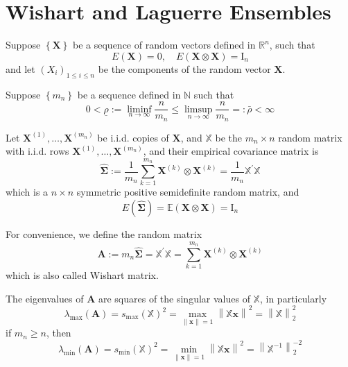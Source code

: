 \chapter{Wishart and Laguerre Ensembles}

Suppose $\left\{\mathbf{X}\right\}$ be a sequence of random vectors defined in $\mathbb{R}^{n}$, such that
\begin{equation*}
    E\left(\mathbf{X}\right)=0,\quad E\left(\mathbf{X}\otimes\mathbf{X}\right)=\mathrm{I}_{n}
\end{equation*}
and let $\left(X_{i}\right)_{1\leq i\leq n}$ be the components of the random vector $\mathbf{X}$.

Suppose $\left\{m_{n}\right\}$ be a sequence defined in $\mathbb{N}$ such that
\begin{equation*}
    0<\underline{\rho}:=\liminf_{n\rightarrow\infty}\frac{n}{m_{n}}\leq\limsup_{n\rightarrow\infty}\frac{n}{m_{n}}=:\bar{\rho}<\infty
\end{equation*}

Let $\mathbf{X}^{(1)},\ldots,\mathbf{X}^{\left(m_{n}\right)}$ be i.i.d. copies of $\mathbf{X}$, and $\mathbb{X}$ be the $m_{n}\times n$ random matrix with i.i.d. rows $\mathbf{X}^{(1)},\ldots,\mathbf{X}^{\left(m_{n}\right)}$, and their empirical covariance matrix is
\begin{equation*}
    \widehat{\boldsymbol{\Sigma}}:=\frac{1}{m_{n}}\sum_{k=1}^{m_{n}}\mathbf{X}^{(k)}\otimes \mathbf{X}^{(k)}=\frac{1}{m_{n}}\mathbb{X}^{\prime}\mathbb{X}
\end{equation*}
which is a $n\times n$ symmetric positive semidefinite random matrix, and
\begin{equation*}
    E\left(\widehat{\boldsymbol{\Sigma}}\right)=\mathbb{E}\left(\mathbf{X}\otimes\mathbf{X}\right)=\mathrm{I}_{n}
\end{equation*}

For convenience, we define the random matrix
\begin{equation*}
    \mathbf{A}:=m_{n}\widehat{\boldsymbol{\Sigma}}=\mathbb{X}^{\prime}\mathbb{X}=\sum_{k=1}^{m_{n}}\mathbf{X}^{(k)}\otimes\mathbf{X}^{(k)}
\end{equation*}
which is also called Wishart matrix.

\begin{theorem}
    The eigenvalues of $\mathbf{A}$ are squares of the singular values of $\mathbb{X}$, in particularly
    \begin{equation}
        \lambda_{\max}\left(\mathbf{A}\right)=s_{\max}\left(\mathbb{X}\right)^{2}=\max_{\|\mathbf{x}\|=1}\left\|\mathbb{X}\mathbf{x}\right\|^{2}=\left\|\mathbb{X}\right\|_{2}^{2}
    \end{equation}
    if $m_{n}\geq n$, then
    \begin{equation}
        \lambda_{\min}\left(\mathbf{A}\right)=s_{\min}\left(\mathbb{X}\right)^{2}=\min_{\|\mathbf{x}\|=1}\left\|\mathbb{X}\mathbf{x}\right\|^{2}=\left\|\mathbb{X}^{-1}\right\|_{2}^{-2}
    \end{equation}
\end{theorem}

